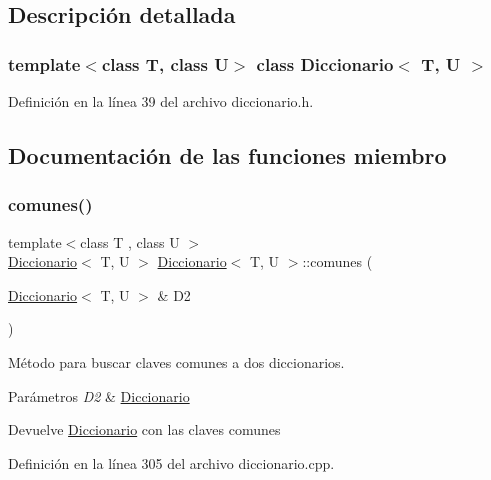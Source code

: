 \subsection{Descripción detallada}
\subsubsection*{template$<$class T, class U$>$\newline
class Diccionario$<$ T, U $>$}



Definición en la línea 39 del archivo diccionario.\+h.



\subsection{Documentación de las funciones miembro}
\mbox{\label{classDiccionario_a5c10f12efd2883665df3bee021da28f9}} 
\subsubsection{\texorpdfstring{comunes()}{comunes()}}
{\footnotesize\ttfamily template$<$class T , class U $>$ \\
\hyperlink{classDiccionario}{Diccionario}$<$ T, U $>$ \hyperlink{classDiccionario}{Diccionario}$<$ T, U $>$\+::comunes (\begin{DoxyParamCaption}\item[{\hyperlink{classDiccionario}{Diccionario}$<$ T, U $>$ \&}]{D2 }\end{DoxyParamCaption})}



Método para buscar claves comunes a dos diccionarios. 


\begin{DoxyParams}{Parámetros}
{\em D2} & \hyperlink{classDiccionario}{Diccionario} \\
\hline
\end{DoxyParams}
\begin{DoxyReturn}{Devuelve}
\hyperlink{classDiccionario}{Diccionario} con las claves comunes 
\end{DoxyReturn}


Definición en la línea 305 del archivo diccionario.\+cpp.


